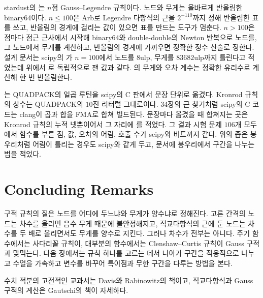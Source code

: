 \begin{instardust}
stardust의 는 $n$점 Gauss--Legendre 규칙이다. 노드와 무게는 올바르게 반올림한 binary64이다. $n\le100$은 Arb로 Legendre 다항식의 근을 $2^{-110}$까지 정해 반올림한 표를 쓰고, 반올림의 경계에 걸리는 값이 있으면 표를 만드는 도구가 멈춘다. $n>100$은 점마다 점근 근사에서 시작해 binary64와 double-double의 Newton 반복으로 노드를, 그 노드에서 무게를 계산하고, 반올림의 경계에 가까우면 정확한 정수 산술로 정한다. 설계 문서는 scipy의 가 $n=100$에서 노드를 $8$ulp, 무게를 $83682$ulp까지 틀린다고 적었는데 위에서 로 독립적으로 잰 값과 같다. 의 무게와 오차 계수는 정확한 유리수로 계산해 한 번 반올림한다.
\end{instardust}

\begin{instardust}
는 QUADPACK의 일곱 루틴을 scipy의 C 판에서 문장 단위로 옮겼다. Kronrod 규칙의 상수는 QUADPACK의 $10$진 리터럴 그대로이다. 34장의 근 찾기처럼 scipy의 C 코드는 clang이 곱과 합을 FMA로 합쳐 빌드된다. 문장마다 옮겼을 때 합쳐지는 곳은 Kronrod 규칙의 누적 넷뿐이어서 그 자리에 를 적었다. 그 결과 시험 문제 $106$개 모두에서 함수를 부른 점, 값, 오차의 어림, 호출 수가 scipy와 비트까지 같다. 위의 좁은 봉우리처럼 어림이 틀리는 경우도 scipy와 같게 두고, 문서에 봉우리에서 구간을 나누는 법을 적었다.
\end{instardust}

\section{Concluding Remarks}

구적 규칙의 질은 노드를 어디에 두느냐와 무게가 양수냐로 정해진다. 고른 간격의 노드는 차수를 올리면 음수 무게 때문에 불안정해지고, 직교다항식의 근에 둔 노드는 차수를 두 배로 올리면서도 무게를 양수로 지킨다. 그러나 차수가 전부는 아니다. 주기 함수에서는 사다리꼴 규칙이, 대부분의 함수에서는 Clenshaw--Curtis 규칙이 Gauss 구적과 맞먹는다. 다음 장에서는 규칙 하나를 고르는 데서 나아가 구간을 적응적으로 나누고 수열을 가속하고 변수를 바꾸어 특이점과 무한 구간을 다루는 방법을 본다.

수치 적분의 고전적인 교과서는 Davis와 Rabinowitz의 책\cite{davis1984methods}이고, 직교다항식과 Gauss 구적의 계산은 Gautschi의 책\cite{gautschi2004orthogonal}이 자세하다.

\chapterreferences

